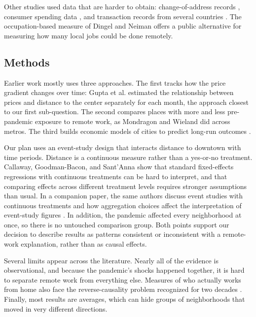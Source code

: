 \documentclass[11pt]{article}
\begin{document}
Other studies used data that are harder to obtain: change-of-address records \cite{ramani2021donut,ramani2024reshapes}, consumer spending data \cite{ramani2024reshapes}, and transaction records from several countries \cite{ahrend2023expanding}. The occupation-based measure of Dingel and Neiman \cite{dingel2020jobs} offers a public alternative for measuring how many local jobs could be done remotely.

\subsection{Methods}

Earlier work mostly uses three approaches. The first tracks how the price gradient changes over time: Gupta et al. \cite{gupta2022flattening} estimated the relationship between prices and distance to the center separately for each month, the approach closest to our first sub-question. The second compares places with more and less pre-pandemic exposure to remote work, as Mondragon and Wieland \cite{mondragon2022housing} did across metros. The third builds economic models of cities to predict long-run outcomes \cite{brueckner2023spatial,howard2023short}.

Our plan uses an event-study design that interacts distance to downtown with time periods. Distance is a continuous measure rather than a yes-or-no treatment. Callaway, Goodman-Bacon, and Sant'Anna \cite{callaway2024did} show that standard fixed-effects regressions with continuous treatments can be hard to interpret, and that comparing effects across different treatment levels requires stronger assumptions than usual. In a companion paper, the same authors discuss event studies with continuous treatments and how aggregation choices affect the interpretation of event-study figures \cite{callaway2024event}. In addition, the pandemic affected every neighborhood at once, so there is no untouched comparison group. Both points support our decision to describe results as patterns consistent or inconsistent with a remote-work explanation, rather than as causal effects.

Several limits appear across the literature. Nearly all of the evidence is observational, and because the pandemic's shocks happened together, it is hard to separate remote work from everything else. Measures of who actually works from home also face the reverse-causality problem recognized for two decades \cite{mokhtarian2004telecommuting,dingel2020jobs,mondragon2022housing}. Finally, most results are averages, which can hide groups of neighborhoods that moved in very different directions.
\end{document}

